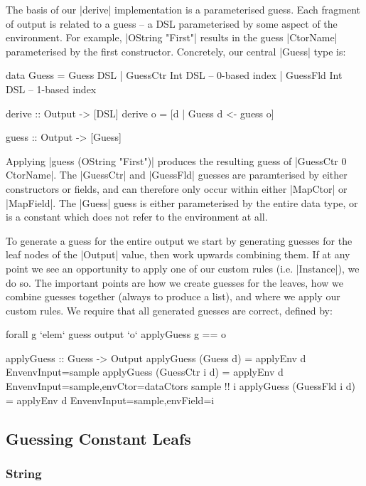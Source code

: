 \documentclass[preprint,draft]{sigplanconf}
\begin{document}
The basis of our |derive| implementation is a parameterised guess. Each fragment of output is related to a guess -- a DSL parameterised by some aspect of the environment. For example, |OString "First"| results in the guess |CtorName| parameterised by the first constructor. Concretely, our central |Guess| type is:

\begin{code}
data Guess  =  Guess DSL
            |  GuessCtr Int DSL -- 0-based index
            |  GuessFld Int DSL -- 1-based index

derive :: Output -> [DSL]
derive o = [d | Guess d <- guess o]

guess :: Output -> [Guess]
\end{code}

Applying |guess (OString "First")| produces the resulting guess of |GuessCtr 0 CtorName|. The |GuessCtr| and |GuessFld| guesses are paramterised by either constructors or fields, and can therefore only occur within either |MapCtor| or |MapField|. The |Guess| guess is either parameterised by the entire data type, or is a constant which does not refer to the environment at all.

To generate a guess for the entire output we start by generating guesses for the leaf nodes of the |Output| value, then work upwards combining them. If at any point we see an opportunity to apply one of our custom rules (i.e. |Instance|), we do so. The important points are how we create guesses for the leaves, how we combine guesses together (always to produce a list), and where we apply our custom rules. We require that all generated guesses are correct, defined by:

\ignore\begin{code}
forall g `elem` guess output `o` applyGuess g == o
\end{code}
\begin{code}
applyGuess :: Guess -> Output
applyGuess (Guess       d) = applyEnv d
    Env{envInput=sample}
applyGuess (GuessCtr i  d) = applyEnv d
    Env{envInput=sample,envCtor=dataCtors sample !! i}
applyGuess (GuessFld i  d) = applyEnv d
    Env{envInput=sample,envField=i}
\end{code}

\subsection{Guessing Constant Leafs}

\subsubsection{String}
\end{document}
